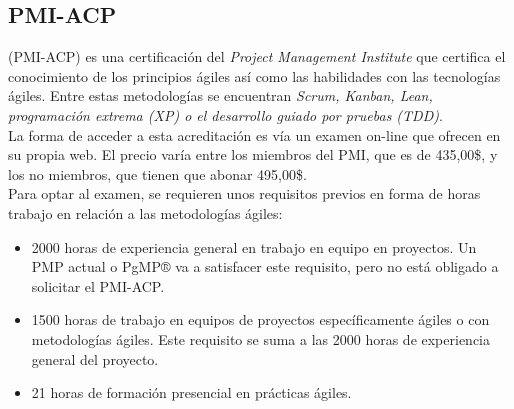 \subsection{PMI-ACP}

 (PMI-ACP) es una certificación del \emph{Project Management Institute} que certifica el conocimiento de los principios ágiles así como las habilidades con las tecnologías ágiles. Entre estas metodologías se encuentran \emph{Scrum, Kanban, Lean, programación extrema (XP) o el desarrollo guiado por pruebas (TDD)}.\\

La forma de acceder a esta acreditación es vía un examen on-line que ofrecen en su propia web. El precio varía entre los miembros del PMI, que es de 435,00\$, y los no miembros, que tienen que abonar 495,00\$.\\

Para optar al examen, se requieren unos requisitos previos en forma de horas trabajo en relación a las metodologías ágiles:
\begin{itemize}
	\item 2000 horas de experiencia general en trabajo en equipo en proyectos. Un PMP actual o PgMP® va a satisfacer este requisito, pero no está obligado a solicitar el PMI-ACP.
	\item 1500 horas de trabajo en equipos de proyectos específicamente ágiles o con metodologías ágiles. Este requisito se suma a las 2000 horas de experiencia general del proyecto.
	\item 21 horas de formación presencial en prácticas ágiles.
\end{itemize}

